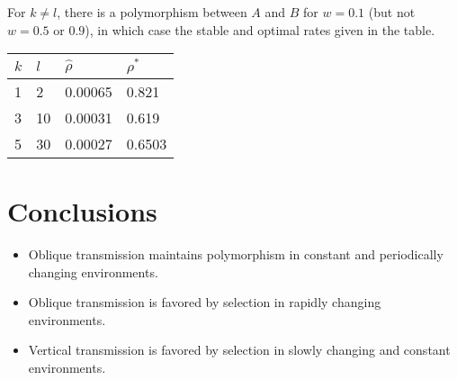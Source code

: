 \documentclass[a0,landscape]{a0poster}
\begin{document}
\begin{multicols}{4}
For $k \ne l$, there is a polymorphism between $A$ and $B$ for $w=0.1$ (but not $w=0.5$ or $0.9$), in which case the stable and optimal rates given in the table.

\begin{center}\vspace{1cm}
\begin{tabular}{p{2.5cm} p{2.5cm} p{4.5cm} p{4.5cm}}
\toprule
\textbf{$k$} & \textbf{$l$ } & \textbf{$\hat{\rho}$} & \textbf{$\rho^*$} \\
\midrule
1 & 2 & 0.00065 & 0.821 \\
3 & 10 & 0.00031 & 0.619 \\
5 & 30 & 0.00027 & 0.6503 \\
\bottomrule
\end{tabular}
\end{center}\vspace{1cm}



\section*{Conclusions}

\begin{itemize}
\item Oblique transmission maintains polymorphism in constant and periodically changing environments.
\item Oblique transmission is favored by selection in rapidly changing environments.
\item Vertical transmission is favored by selection in slowly changing and constant environments.
\end{itemize}





\end{multicols}
\end{document}
